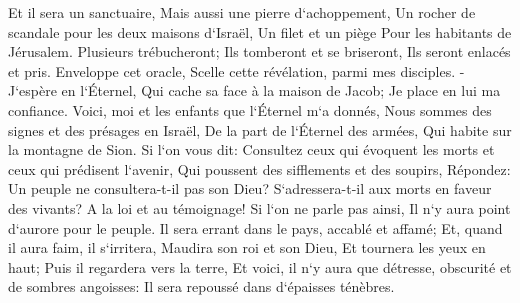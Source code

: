\verse Et il sera un sanctuaire, Mais aussi une pierre d`achoppement, Un rocher de scandale pour les deux maisons d`Israël, Un filet et un piège Pour les habitants de Jérusalem. 
\verse Plusieurs trébucheront; Ils tomberont et se briseront, Ils seront enlacés et pris. 
\verse Enveloppe cet oracle, Scelle cette révélation, parmi mes disciples. - 
\verse J`espère en l`Éternel, Qui cache sa face à la maison de Jacob; Je place en lui ma confiance. 
\verse Voici, moi et les enfants que l`Éternel m`a donnés, Nous sommes des signes et des présages en Israël, De la part de l`Éternel des armées, Qui habite sur la montagne de Sion. 
\verse Si l`on vous dit: Consultez ceux qui évoquent les morts et ceux qui prédisent l`avenir, Qui poussent des sifflements et des soupirs, Répondez: Un peuple ne consultera-t-il pas son Dieu? S`adressera-t-il aux morts en faveur des vivants? 
\verse A la loi et au témoignage! Si l`on ne parle pas ainsi, Il n`y aura point d`aurore pour le peuple. 
\verse Il sera errant dans le pays, accablé et affamé; Et, quand il aura faim, il s`irritera, Maudira son roi et son Dieu, Et tournera les yeux en haut; 
\verse Puis il regardera vers la terre, Et voici, il n`y aura que détresse, obscurité et de sombres angoisses: Il sera repoussé dans d`épaisses ténèbres. 

